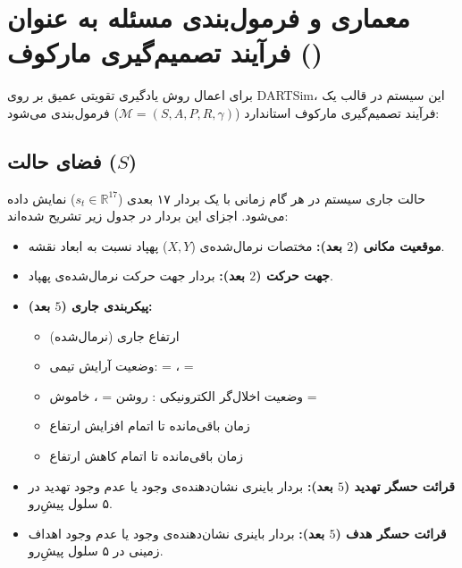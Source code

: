 \documentclass[oneside,openany,a4paper,12pt]{article}
\begin{document}
\section{معماری و فرمول‌بندی مسئله به عنوان فرآیند تصمیم‌گیری مارکوف ()}
برای اعمال روش یادگیری تقویتی عمیق بر روی DARTSim، این سیستم در قالب یک فرآیند تصمیم‌گیری مارکوف استاندارد ($\mathcal{M} = (S, A, P, R, \gamma)$) فرمول‌بندی می‌شود:

\subsection{فضای حالت ($S$)}
حالت جاری سیستم در هر گام زمانی با یک بردار ۱۷ بعدی ($s_t \in \mathbb{R}^{17}$) نمایش داده می‌شود. اجزای این بردار در جدول زیر تشریح شده‌اند:
\begin{itemize}
    \item \textbf{موقعیت مکانی ($2$ بعد):} مختصات نرمال‌شده‌ی ($X, Y$) پهپاد نسبت به ابعاد نقشه.
    \item \textbf{جهت حرکت ($2$ بعد):} بردار جهت حرکت نرمال‌شده‌ی پهپاد.
    \item \textbf{پیکربندی جاری ($5$ بعد):}
    \begin{itemize}
        \item ارتفاع جاری (نرمال‌شده)
        \item وضعیت آرایش تیمی:  = ،  = 
        \item وضعیت اخلال‌گر الکترونیکی : روشن = ، خاموش = 
        \item زمان باقی‌مانده تا اتمام افزایش ارتفاع 
        \item زمان باقی‌مانده تا اتمام کاهش ارتفاع 
    \end{itemize}
    \item \textbf{قرائت حسگر تهدید ($5$ بعد):} بردار باینری نشان‌دهنده‌ی وجود یا عدم وجود تهدید در ۵ سلول پیشِ‌رو.
    \item \textbf{قرائت حسگر هدف ($5$ بعد):} بردار باینری نشان‌دهنده‌ی وجود یا عدم وجود اهداف زمینی در ۵ سلول پیشِ‌رو.
\end{itemize}
\end{document}
